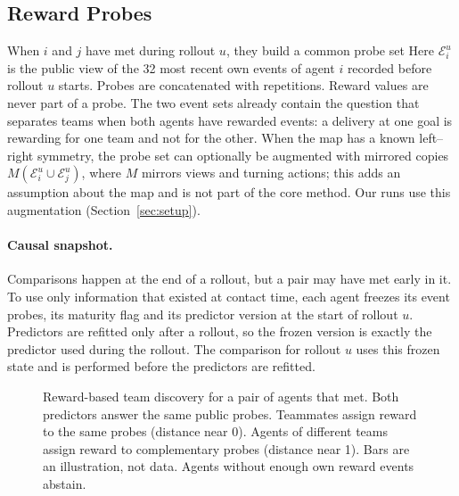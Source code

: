 \documentclass{article}
\begin{document}
\subsection{Reward Probes}
When $i$ and $j$ have met during rollout $u$, they build a common probe set
\ProbeEquation
Here $\mathcal E_i^u$ is the public view of the 32 most recent own events of agent $i$ recorded before rollout $u$ starts. Probes are concatenated with repetitions. Reward values are never part of a probe. The two event sets already contain the question that separates teams when both agents have rewarded events: a delivery at one goal is rewarding for one team and not for the other. When the map has a known left--right symmetry, the probe set can optionally be augmented with mirrored copies $M(\mathcal E_i^u\cup\mathcal E_j^u)$, where $M$ mirrors views and turning actions; this adds an assumption about the map and is not part of the core method. Our runs use this augmentation (Section~\ref{sec:setup}).

\paragraph{Causal snapshot.}
Comparisons happen at the end of a rollout, but a pair may have met early in it. To use only information that existed at contact time, each agent freezes its event probes, its maturity flag and its predictor version at the start of rollout $u$. Predictors are refitted only after a rollout, so the frozen version is exactly the predictor used during the rollout. The comparison for rollout $u$ uses this frozen state and is performed before the predictors are refitted.

\begin{figure}[t]
\centering\resizebox{.97\textwidth}{!}{}
\caption{Reward-based team discovery for a pair of agents that met. Both predictors answer the same public probes. Teammates assign reward to the same probes (distance near 0). Agents of different teams assign reward to complementary probes (distance near 1). Bars are an illustration, not data. Agents without enough own reward events abstain.}\label{fig:discovery}
\end{figure}
\end{document}
